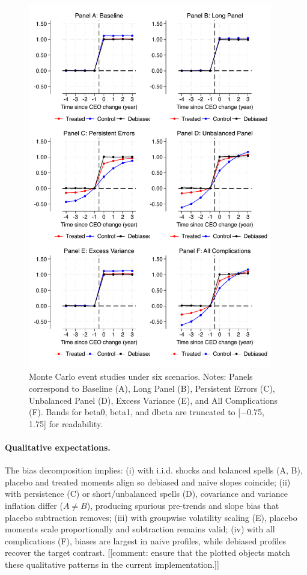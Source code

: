 \documentclass[11pt,a4paper]{article}
\begin{document}
\begin{figure}[htbp]
 \centering
 \includegraphics[width=0.95\textwidth]{figure/figuremc.pdf}
 \caption{Monte Carlo event studies under six scenarios. Notes: Panels correspond to Baseline (A), Long Panel (B), Persistent Errors (C), Unbalanced Panel (D), Excess Variance (E), and All Complications (F). Bands for beta0, beta1, and dbeta are truncated to [−0.75, 1.75] for readability.}
 \label{fig:mc}
\end{figure}

\paragraph{Qualitative expectations.} The bias decomposition implies: (i) with i.i.d. shocks and balanced spells (A, B), placebo and treated moments align so debiased and naive slopes coincide; (ii) with persistence (C) or short/unbalanced spells (D), covariance and variance inflation differ ($A\neq B$), producing spurious pre-trends and slope bias that placebo subtraction removes; (iii) with groupwise volatility scaling (E), placebo moments scale proportionally and subtraction remains valid; (iv) with all complications (F), biases are largest in naive profiles, while debiased profiles recover the target contrast. [[comment: ensure that the plotted objects match these qualitative patterns in the current implementation.]]
\end{document}
